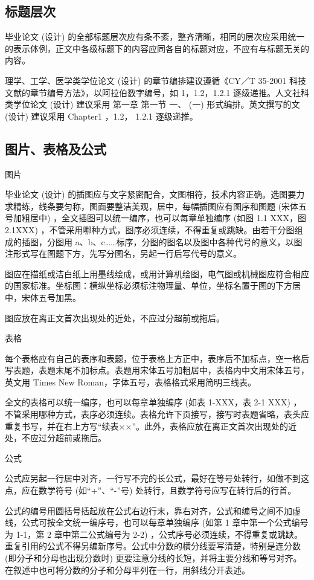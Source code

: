 \subsection{标题层次}
毕业论文 (设计) 的全部标题层次应有条不紊，整齐清晰，相同的层次应采用统一的表示体例，正文中各级标题下的内容应同各自的标题对应，不应有与标题无关的内容。

理学、工学、医学类学位论文 (设计) 的章节编排建议遵循《CY／T 35-2001 科技文献的章节编号方法》，以阿拉伯数字编号，如 1，1.2，1.2.1 逐级递推。人文社科类学位论文 (设计) 建议采用 第一章 第一节 一、 (一) 形式编排。英文撰写的文 (设计) 建议采用 Chapter1 ，1.2， 1.2.1 逐级递推。
\subsection{图片、表格及公式}
\begin{compactenum}
\item 图片

毕业论文 (设计) 的插图应与文字紧密配合，文图相符，技术内容正确。选图要力求精练，线条要匀称，图面要整洁美观，居中，每幅插图应有图序和图题 (宋体五号加粗居中) ，全文插图可以统一编序，也可以每章单独编序 (如图 1.1 XXX，图 2.1XXX) ，不管采用哪种方式，图序必须连续，不得重复或跳缺。由若干分图组成的插图，分图用 a、b、c……标序，分图的图名以及图中各种代号的意义，以图注形式写在图题下方，先写分图名，另起一行后写代号的意义。

图应在描纸或洁白纸上用墨线绘成，或用计算机绘图，电气图或机械图应符合相应的国家标准。坐标图：横纵坐标必须标注物理量、单位，坐标名置于图的下方居中，宋体五号加黑。

图应放在离正文首次出现处的近处，不应过分超前或拖后。
\item 表格

每个表格应有自己的表序和表题，位于表格上方正中，表序后不加标点，空一格后写表题，表题末尾不加标点。表题用宋体五号加粗居中，表格内中文用宋体五号，英文用 Times New Roman，字体五号，表格格式采用简明三线表。

全文的表格可以统一编序，也可以每章单独编序 (如表 1-XXX，表 2-1 XXX) ，不管采用哪种方式，表序必须连续。表格允许下页接写，接写时表题省略，表头应重复书写，并在右上方写“续表××”。此外，表格应放在离正文首次出现处的近处，不应过分超前或拖后。

\item 公式

公式应另起一行居中对齐，一行写不完的长公式，最好在等号处转行，如做不到这点，应在数学符号 (如“+”、“-”号) 处转行，且数学符号应写在转行后的行首。

公式的编号用圆括号括起放在公式右边行末，靠右对齐，公式和编号之间不加虚线，公式可按全文统一编序号，也可以每章单独编序 (如第 1 章中第一个公式编号为 1-1，第 2 章中第二公式编号为 2-2) ，公式序号必须连续，不得重复或跳缺。重复引用的公式不得另编新序号。公式中分数的横分线要写清楚，特别是连分数 (即分子和分母也出现分数时) 更要注意分线的长短，并将主要分线和等号对齐。在叙述中也可将分数的分子和分母平列在一行，用斜线分开表述。
\end{compactenum}

